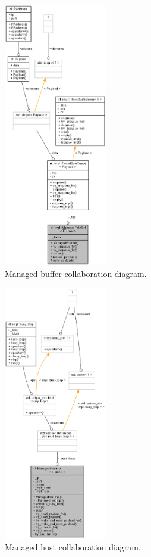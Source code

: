 \documentclass[12pt]{report}
\newcommand{\+}{\discretionary{\mbox{\scriptsize$\hookleftarrow$}}{}{}}
\begin{document}
                \begin{figure}[H]
                \caption{Managed buffer collaboration diagram.}
                \centering
                \includegraphics[width=0.4\textwidth]{d/coll/coll_pcktbuf.png}
                \end{figure}

                \newpage

                \begin{figure}[H]
                \caption{Managed host collaboration diagram.}
                \centering
                \includegraphics[width=0.4\textwidth]{d/coll/coll_manhost.png}
                \end{figure}
\end{document}
